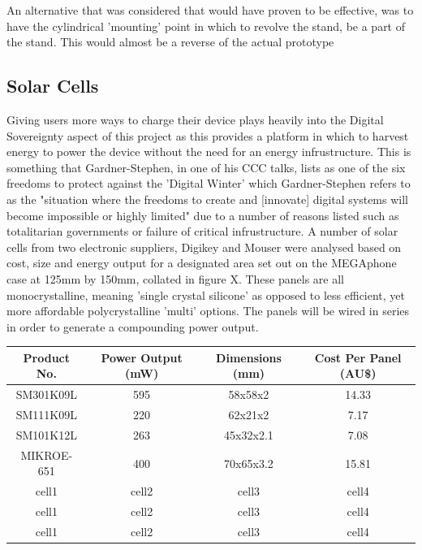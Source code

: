 An alternative that was considered that would have proven to be effective, was to have the cylindrical 'mounting' point in which to revolve the stand, be a part of the stand.
This would almost be a reverse of the actual prototype


\subsection{Solar Cells}

Giving users more ways to charge their device plays heavily into the Digital Sovereignty aspect of this project as this provides a platform in which to harvest energy to power the device without the need for an energy infrustructure.
This is something that Gardner-Stephen, in one of his CCC talks, lists as one of the six freedoms to protect against the 'Digital Winter' which Gardner-Stephen refers to as the "situation where the freedoms to create and [innovate] digital systems will become impossible or highly limited" due to a number of reasons listed such as totalitarian governments or failure of critical infrustructure\cite{freedoms}.
A number of solar cells from two electronic suppliers, Digikey and Mouser were analysed based on cost, size and energy output for a designated area set out on the MEGAphone case at 125mm by 150mm, collated in figure X. %
These panels are all monocrystalline, meaning 'single crystal silicone' as opposed to less efficient, yet more affordable polycrystalline 'multi' options.
The panels will be wired in series in order to generate a compounding power output.

\begin{center}
    \begin{tabular}{ |c|c|c|c| }
    \hline
    Product No. & Power Output (mW) & Dimensions (mm) & Cost Per Panel (AU\$) \\
    \hline
    SM301K09L & 595 & 58x58x2 & 14.33 \\
    \hline
    SM111K09L & 220 & 62x21x2 & 7.17 \\ 
    \hline
    SM101K12L & 263 & 45x32x2.1 & 7.08 \\
    \hline
    MIKROE-651 & 400 & 70x65x3.2 & 15.81 \\
    \hline
    cell1 & cell2 & cell3 & cell4 \\
    \hline
    cell1 & cell2 & cell3 & cell4 \\
    \hline
    cell1 & cell2 & cell3 & cell4 \\
    \hline
    \end{tabular}
\end{center}

